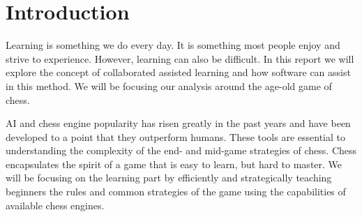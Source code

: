 \chapter{Introduction}\label{ch:introduction}

Learning is something we do every day.
It is something most people enjoy and strive to experience.
However, learning can also be difficult.
In this report we will explore the concept of collaborated assisted learning and how software can assist in this method.
We will be focusing our analysis around the age-old game of chess.

AI and chess engine popularity has risen greatly in the past years and have been developed to a point that they
outperform humans.
These tools are essential to understanding the complexity of the end- and mid-game strategies of chess.
Chess encapsulates the spirit of a game that is easy to learn, but hard to master.
We will be focusing on the learning part by efficiently and strategically teaching beginners the rules and common
strategies of the game using the capabilities of available chess engines.
